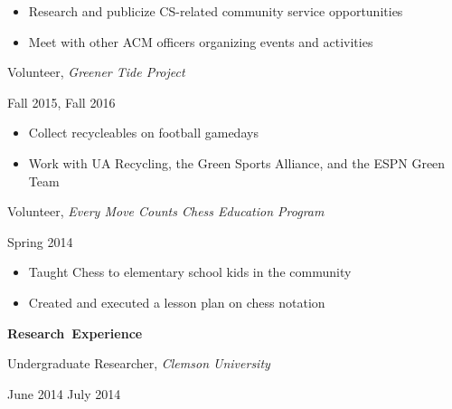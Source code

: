 \documentclass[11pt]{article}
\begin{document}
\begin{itemize}
  \item Research and publicize CS-related community service opportunities
  \item Meet with other ACM officers organizing events and activities
\end{itemize}

\vspace{0.4em}
\begin{minipage}[t]{0.65\textwidth}
\flushleft
Volunteer, \textit{Greener Tide Project}\\
\end{minipage}
\begin{minipage}[t]{0.30\textwidth}
\flushright
Fall 2015, Fall 2016\\
\end{minipage}

\begin{itemize}
  \item Collect recycleables on football gamedays
  \item Work with UA Recycling, the Green Sports Alliance, and the ESPN Green Team
\end{itemize}

\vspace{0.4em}
\begin{minipage}[t]{0.65\textwidth}
\flushleft
Volunteer, \textit{Every Move Counts Chess Education Program}\\
\end{minipage}
\begin{minipage}[t]{0.30\textwidth}
\flushright
Spring 2014\\
\end{minipage}

\begin{itemize}
  \item Taught Chess to elementary school kids in the community
  \item Created and executed a lesson plan on chess notation
\end{itemize}

\vspace{0.8em}
\hbox{\large \textbf{Research Experience}}

\begin{minipage}[t]{0.65\textwidth}
\flushleft
Undergraduate Researcher, \textit{Clemson University}\\
\end{minipage}
\begin{minipage}[t]{0.30\textwidth}
\flushright
June 2014 \space \textemdash \space July 2014\\
\end{minipage}
\end{document}
